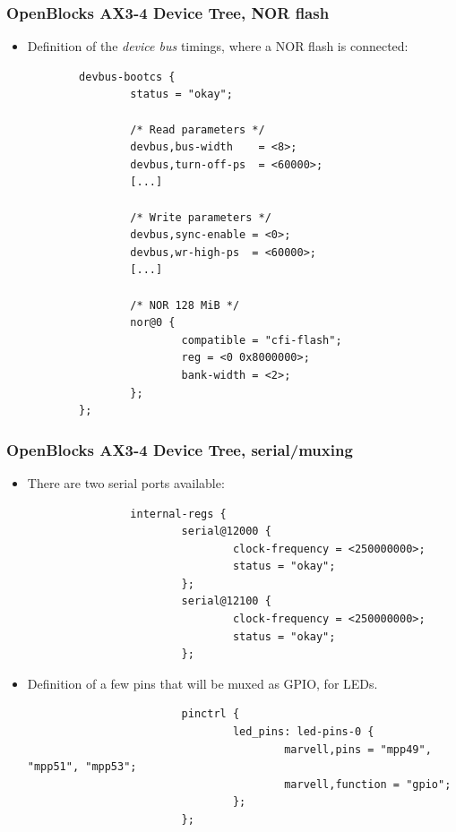 \begin{frame}[fragile]
  \frametitle{OpenBlocks AX3-4 Device Tree, NOR flash}
\begin{itemize}
\item Definition of the {\em device bus} timings, where a NOR flash is
  connected:
  \begin{block}{}
    \begin{verbatim}
        devbus-bootcs {
                status = "okay";

                /* Read parameters */
                devbus,bus-width    = <8>;
                devbus,turn-off-ps  = <60000>;
                [...]

                /* Write parameters */
                devbus,sync-enable = <0>;
                devbus,wr-high-ps  = <60000>;
                [...]

                /* NOR 128 MiB */
                nor@0 {
                        compatible = "cfi-flash";
                        reg = <0 0x8000000>;
                        bank-width = <2>;
                };
        };
      \end{verbatim}
    \end{block}
  \end{itemize}
\end{frame}

\begin{frame}[fragile]
  \frametitle{OpenBlocks AX3-4 Device Tree, serial/muxing}
\begin{itemize}
\item There are two serial ports available:
  \begin{block}{}
    \begin{verbatim}
                internal-regs {
                        serial@12000 {
                                clock-frequency = <250000000>;
                                status = "okay";
                        };
                        serial@12100 {
                                clock-frequency = <250000000>;
                                status = "okay";
                        };
    \end{verbatim}
    \end{block}
  \item Definition of a few pins that will be muxed as GPIO, for LEDs.
  \begin{block}{}
    \begin{verbatim}
                        pinctrl {
                                led_pins: led-pins-0 {
                                        marvell,pins = "mpp49", "mpp51", "mpp53";
                                        marvell,function = "gpio";
                                };
                        };
    \end{verbatim}
  \end{block}
  \end{itemize}
\end{frame}

